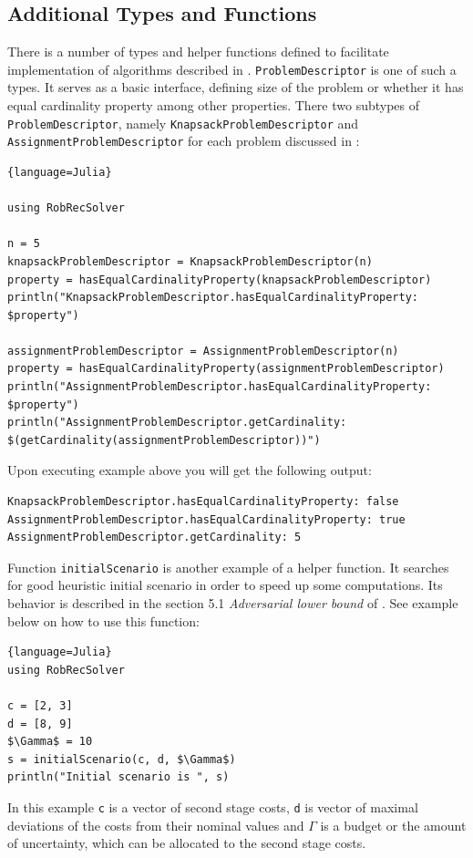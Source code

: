 \subsection{Additional Types and Functions}
There is a number of types and helper functions defined to facilitate implementation of algorithms described in \cite{HKZ19}. \texttt{ProblemDescriptor} is one of such a types. It serves as a basic interface, defining size of the problem or whether it has equal cardinality property among other properties. There two subtypes of \texttt{ProblemDescriptor}, namely \texttt{KnapsackProblemDescriptor} and \texttt{AssignmentProblemDescriptor} for each problem discussed in \cite{HKZ19}:
\begin{lstlisting}{language=Julia}

using RobRecSolver

n = 5
knapsackProblemDescriptor = KnapsackProblemDescriptor(n)
property = hasEqualCardinalityProperty(knapsackProblemDescriptor)
println("KnapsackProblemDescriptor.hasEqualCardinalityProperty: $property")

assignmentProblemDescriptor = AssignmentProblemDescriptor(n)
property = hasEqualCardinalityProperty(assignmentProblemDescriptor)
println("AssignmentProblemDescriptor.hasEqualCardinalityProperty: $property")
println("AssignmentProblemDescriptor.getCardinality: $(getCardinality(assignmentProblemDescriptor))")

\end{lstlisting}
Upon executing example above you will get the following output:
\begin{lstlisting}
KnapsackProblemDescriptor.hasEqualCardinalityProperty: false
AssignmentProblemDescriptor.hasEqualCardinalityProperty: true
AssignmentProblemDescriptor.getCardinality: 5
\end{lstlisting}

Function \texttt{initialScenario} is another example of a helper function. It searches for good heuristic initial scenario in order to speed up some computations. Its behavior is described in the section 5.1 \textit{Adversarial lower bound} of \cite{HKZ19}. See example below on how to use this function:
\begin{lstlisting}[mathescape]{language=Julia}
using RobRecSolver

c = [2, 3]
d = [8, 9]
$\Gamma$ = 10
s = initialScenario(c, d, $\Gamma$)
println("Initial scenario is ", s)
\end{lstlisting}

In this example \texttt{c} is a vector of second stage costs, \texttt{d} is vector of maximal deviations of the costs from their nominal values and \texttt{$\Gamma$} is a budget or the amount of uncertainty, which can be allocated to the second stage costs.

